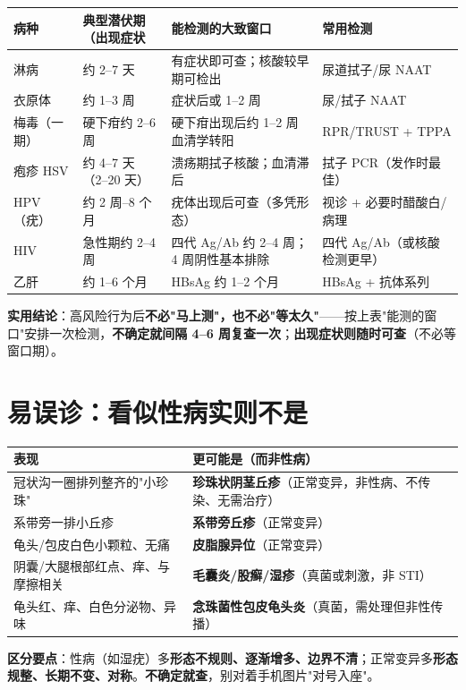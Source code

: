 \documentclass[12pt,UTF8,openany]{ctexbook}
\begin{document}
\begin{tabularx}{\textwidth}{l X X X}
\toprule
\textbf{病种} & \textbf{典型潜伏期（出现症状} & \textbf{能检测的大致窗口} & \textbf{常用检测} \\
\midrule
淋病 & 约 2--7 天 & 有症状即可查；核酸较早期可检出 & 尿道拭子/尿 NAAT \\
衣原体 & 约 1--3 周 & 症状后或 1--2 周 & 尿/拭子 NAAT \\
梅毒（一期） & 硬下疳约 2--6 周 & 硬下疳出现后约 1--2 周血清学转阳 & RPR/TRUST + TPPA \\
疱疹 HSV & 约 4--7 天（2--20 天） & 溃疡期拭子核酸；血清滞后 & 拭子 PCR（发作时最佳） \\
HPV（疣） & 约 2 周--8 个月 & 疣体出现后可查（多凭形态） & 视诊 + 必要时醋酸白/病理 \\
HIV & 急性期约 2--4 周 & 四代 Ag/Ab 约 2--4 周；4 周阴性基本排除 & 四代 Ag/Ab（或核酸检测更早） \\
乙肝 & 约 1--6 个月 & HBsAg 约 1--2 个月 & HBsAg + 抗体系列 \\
\bottomrule
\end{tabularx}

\vspace{0.5em}
\noindent\textbf{实用结论}：高风险行为后\textbf{不必"马上测"，也不必"等太久"}——按上表"能测的窗口"安排一次检测，\textbf{不确定就间隔 4--6 周复查一次}；\textbf{出现症状则随时可查}（不必等窗口期）。

\section{易误诊：看似性病实则不是}

\begin{tabularx}{\textwidth}{l X}
\toprule
\textbf{表现} & \textbf{更可能是}（而非性病） \\
\midrule
冠状沟一圈排列整齐的"小珍珠" & \textbf{珍珠状阴茎丘疹}（正常变异，非性病、不传染、无需治疗） \\
系带旁一排小丘疹 & \textbf{系带旁丘疹}（正常变异） \\
龟头/包皮白色小颗粒、无痛 & \textbf{皮脂腺异位}（正常变异） \\
阴囊/大腿根部红点、痒、与摩擦相关 & \textbf{毛囊炎/股癣/湿疹}（真菌或刺激，非 STI） \\
龟头红、痒、白色分泌物、异味 & \textbf{念珠菌性包皮龟头炎}（真菌，需处理但非性传播） \\
\bottomrule
\end{tabularx}

\noindent\textbf{区分要点}：性病（如湿疣）多\textbf{形态不规则、逐渐增多、边界不清}；正常变异多\textbf{形态规整、长期不变、对称}。\textbf{不确定就查}，别对着手机图片"对号入座"。
\end{document}
